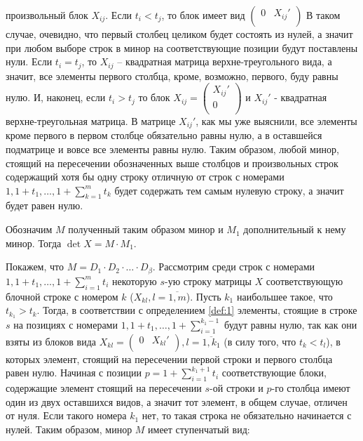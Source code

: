 \documentclass[11pt, a4paper]{article}
\begin{document}
произвольный блок $X_{ij}$. Если $t_i < t_j$, то блок имеет вид $\left(\begin{matrix} 0 & X_{ij}'\\ \end{matrix}\right)$
В таком случае, очевидно, что первый столбец целиком будет состоять из нулей, а значит при любом выборе строк в минор на соответствующие позиции
будут поставлены нули. Если $t_i = t_j$, то $X_{ij}$ -- квадратная матрица верхне-треугольного вида, а значит, все элементы первого столбца, кроме, возможно, первого, 
буду равны нулю. И, наконец, если $t_i > t_j$ то блок $X_{ij} = \left(\begin{matrix} X_{ij}'\\ 0\\ \end{matrix}\right)$ и $X_{ij}'$ - квадратная верхне-треугольная матрица.
В матрице $X_{ij}'$, как мы уже выяснили, все элементы кроме первого в первом столбце обязательно равны нулю, а в оставшейся подматрице и вовсе
все элементы равны нулю. Таким образом, любой минор, стоящий на пересечении обозначенных выше столбцов и произвольных строк содержащий
хотя бы одну строку отличную от строк с номерами $1, 1 + t_1, \dots, 1 + \displaystyle \sum_{k = 1}^{m}{t_k}$ будет содержать тем самым
нулевую строку, а значит будет равен нулю.


Обозначим $M$ полученный таким образом минор и $M_1$ дополнительный к нему минор.
Тогда $\det X = M\cdot M_1$.


Покажем, что $M = D_1 \cdot D_2 \cdot \ldots \cdot D_{\beta}$.
Рассмотрим среди строк с номерами $1, 1 + t_1, \dots, 1 + \displaystyle \sum_{i = 1}^{m}{t_i}$ некоторую $s$-ую строку матрицы $X$ соответствующую блочной строке с номером $k$ ($X_{kl}, l = \overline{1, m}$).
Пусть $k_1$ наибольшее такое, что $t_{k_1} > t_k$.
Тогда, в соответствии с определением \ref{def:1} элементы, стоящие в строке $s$ на позициях с номерами $1, 1 + t_1, \dots, 1 + \displaystyle \sum_{i = 1}^{k_1 - 1}$ будут равны
нулю, так как они взяты из блоков вида $X_{kl} = \left(\begin{matrix} 0 & X_{kl}'\\ \end{matrix}\right), l=\overline{1, k_1}$ (в силу того, что $t_k < t_l$), в которых элемент, стоящий
на пересечении первой строки и первого столбца равен нулю. Начиная с позиции $p = 1 + \displaystyle \sum_{i = 1}^{k_1 + 1}{t_i}$ соответствующие блоки, содержащие элемент стоящий на пересечении $s$-ой строки и
$p$-го столбца имеют один из двух оставшихся видов, а значит тот элемент, в общем случае, отличен от нуля. Если такого номера $k_1$ нет, то такая строка не обязательно начинается с нулей. Таким образом, минор $M$ имеет ступенчатый вид:
\end{document}
